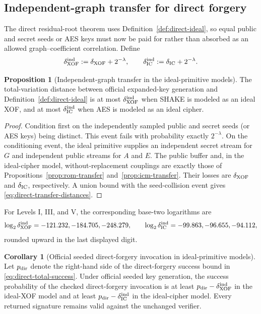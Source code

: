\documentclass[11pt,a4paper]{article}
\theoremstyle{definition}
\newtheorem{proposition}[theorem]{Proposition}
\newtheorem{corollary}[theorem]{Corollary}
\theoremstyle{remark}
\begin{document}
\subsection{Independent-graph transfer for direct forgery}

The direct residual-root theorem uses Definition~\ref{def:direct-ideal}, so equal public
and secret seeds or AES keys must now be paid for rather than absorbed as an
allowed graph--coefficient correlation.  Define
\begin{equation}\label{eq:direct-transfer-distances}
 \delta_{\rm XOF}^{\rm ind}:=\delta_{\rm XOF}+2^{-\lambda},
 \qquad
 \delta_{\rm IC}^{\rm ind}:=\delta_{\rm IC}+2^{-\lambda}.
\end{equation}

\begin{proposition}[Independent-graph transfer in the ideal-primitive models]\label{prop:direct-seeded-transfer}
The total-variation distance between official expanded-key generation and
Definition~\ref{def:direct-ideal} is at most $\delta_{\rm XOF}^{\rm ind}$ when SHAKE is
modeled as an ideal XOF, and at most $\delta_{\rm IC}^{\rm ind}$ when AES is
modeled as an ideal cipher.
\end{proposition}

\begin{proof}
Condition first on the independently sampled public and secret seeds (or AES
keys) being distinct.  This event fails with probability exactly $2^{-\lambda}$.
On the conditioning event, the ideal primitive supplies an independent secret
stream for $G$ and independent public streams for $A$ and $E$.  The public
buffer and, in the ideal-cipher model, without-replacement couplings are
exactly those of Propositions~\ref{prop:rom-transfer} and~\ref{prop:icm-transfer}.  Their losses are
$\delta_{\rm XOF}$ and $\delta_{\rm IC}$, respectively.  A union bound with the
seed-collision event gives \eqref{eq:direct-transfer-distances}.
\end{proof}

For Levels I, III, and V, the corresponding base-two logarithms are
\[
 \log_2\delta_{\rm XOF}^{\rm ind}
   =-121.232,-184.705,-248.279,
 \qquad
 \log_2\delta_{\rm IC}^{\rm ind}
   =-99.863,-96.655,-94.112,
\]
rounded upward in the last displayed digit.

\begin{corollary}[Official seeded direct-forgery invocation in ideal-primitive models]\label{cor:direct-seeded-ideal}
Let $p_{\rm dir}$ denote the right-hand side of the direct-forgery success bound
in \eqref{eq:direct-total-success}.  Under official seeded key generation, the
success probability of the checked direct-forgery invocation is at least
$p_{\rm dir}-\delta_{\rm XOF}^{\rm ind}$ in the ideal-XOF model and at least
$p_{\rm dir}-\delta_{\rm IC}^{\rm ind}$ in the ideal-cipher model.  Every
returned signature remains valid against the unchanged verifier.
\end{corollary}
\end{document}
